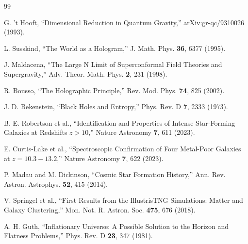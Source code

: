 \documentclass[twocolumn,aps,prd,superscriptaddress,nofootinbib]{revtex4-2}
\begin{document}
\begin{thebibliography}{99}

G. 't Hooft, ``Dimensional Reduction in Quantum Gravity,'' arXiv:gr-qc/9310026 (1993).

L. Susskind, ``The World as a Hologram,'' J. Math. Phys. \textbf{36}, 6377 (1995).

J. Maldacena, ``The Large N Limit of Superconformal Field Theories and Supergravity,'' Adv. Theor. Math. Phys. \textbf{2}, 231 (1998).

R. Bousso, ``The Holographic Principle,'' Rev. Mod. Phys. \textbf{74}, 825 (2002).

J. D. Bekenstein, ``Black Holes and Entropy,'' Phys. Rev. D \textbf{7}, 2333 (1973).

B. E. Robertson et al., ``Identification and Properties of Intense Star-Forming Galaxies at Redshifts $z > 10$,'' Nature Astronomy \textbf{7}, 611 (2023).

E. Curtis-Lake et al., ``Spectroscopic Confirmation of Four Metal-Poor Galaxies at $z = 10.3-13.2$,'' Nature Astronomy \textbf{7}, 622 (2023).

P. Madau and M. Dickinson, ``Cosmic Star Formation History,'' Ann. Rev. Astron. Astrophys. \textbf{52}, 415 (2014).

V. Springel et al., ``First Results from the IllustrisTNG Simulations: Matter and Galaxy Clustering,'' Mon. Not. R. Astron. Soc. \textbf{475}, 676 (2018).

A. H. Guth, ``Inflationary Universe: A Possible Solution to the Horizon and Flatness Problems,'' Phys. Rev. D \textbf{23}, 347 (1981).

\end{thebibliography}
\end{document}
